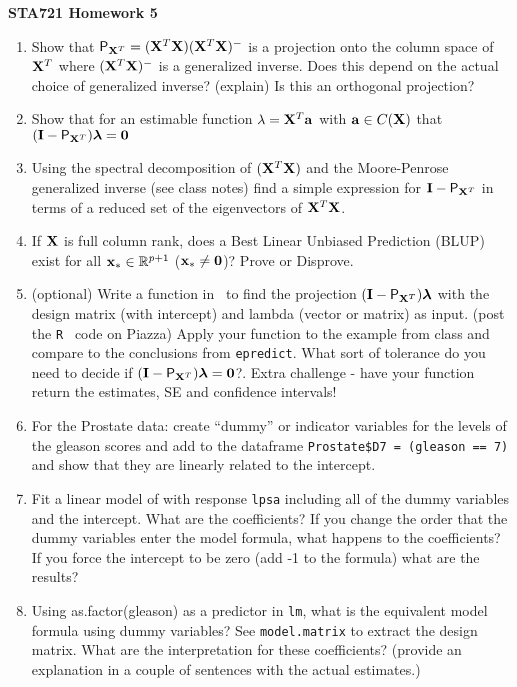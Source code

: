 \documentclass{article}
\begin{document}
{\bf STA721 \hfill Homework 5}

\vspace{.5in}


\begin{enumerate}
\item Show that $\textsf{P}_{\mathbf{X}^T} = (\mathbf{X}^T\mathbf{X}) (\mathbf{X}^T\mathbf{X})^{-}$ is a projection 
  onto the column space of $\mathbf{X}^T$  where $(\mathbf{X}^T\mathbf{X})^{-}$ is a generalized inverse.
  Does this depend on the actual choice of generalized inverse?
  (explain)  Is this an orthogonal projection?

\item Show that for an estimable function $\lambda = \mathbf{X}^T \mathbf{a}$  with
  $\mathbf{a} \in C(\mathbf{X})$ that $(\mathbf{I} - \textsf{P}_{\mathbf{X}^T}) \boldsymbol{\lambda} = \mathbf{0}$
\item Using the spectral decomposition of $(\mathbf{X}^T\mathbf{X})$ and the
  Moore-Penrose generalized inverse (see class notes) find a simple
  expression for $\mathbf{I} - \textsf{P}_{\mathbf{X}^T}$ in terms of a reduced set of the eigenvectors of
  $\mathbf{X}^T\mathbf{X}$.

\item If $\mathbf{X}$ is full column rank, does a Best Linear Unbiased
  Prediction (BLUP) exist for all $\mathbf{x}_*
  \in \mathbb{R}^{p+1}$ ($\mathbf{x}_* \neq \mathbf{0}$)?  Prove or Disprove.
\item (optional) Write a function in \R \ to  find the projection $(\mathbf{I} - \textsf{P}_{\mathbf{X}^T})\boldsymbol{\lambda}$ 
  with the design matrix (with intercept) and lambda (vector or
  matrix) as input.   (post the {\tt R } code on Piazza)
  Apply your function  to the example from class and compare to the
 conclusions from {\tt epredict}.   What sort of tolerance do you need to
 decide if $(\mathbf{I} - \textsf{P}_{\mathbf{X}^T}) \boldsymbol{\lambda} = \mathbf{0}$?.   Extra challenge -
 have your function return the estimates, SE and confidence intervals!  

 \item For the Prostate data:  create ``dummy'' or indicator
   variables for the levels of the gleason
   scores and add to the dataframe  {\tt Prostate\$D7 = (gleason ==
     7)} and show that they are linearly related to the intercept.

\item  Fit a linear model of with response {\tt lpsa}  including all
  of the dummy variables and the intercept. 
What are the coefficients?  If you change the order that the dummy
variables enter the model formula, what happens to the coefficients?
If you force the intercept to be zero (add -1 to the formula) what are
the results?  


\item Using as.factor(gleason) as a predictor in {\tt lm}, what is the
  equivalent model formula using dummy variables?  See
  {\tt model.matrix} to extract the design matrix.
What are the interpretation for these coefficients?  (provide an
explanation in a couple of sentences with the actual estimates.) 


\end{enumerate}
\end{document}
